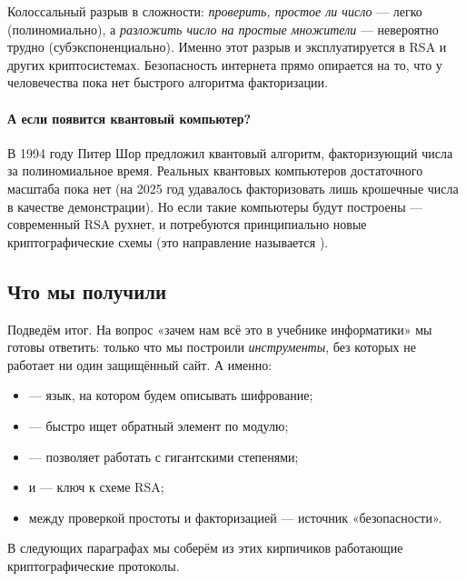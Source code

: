\begin{importantbox}
Колоссальный разрыв в сложности: \emph{проверить, простое ли число} --- легко (полиномиально), а \emph{разложить число на простые множители} --- невероятно трудно (субэкспоненциально). Именно этот разрыв и эксплуатируется в RSA и других криптосистемах. Безопасность интернета прямо опирается на то, что у человечества пока нет быстрого алгоритма факторизации.
\end{importantbox}

\paragraph*{А если появится квантовый компьютер?} В 1994 году Питер Шор предложил квантовый алгоритм, факторизующий числа за полиномиальное время. Реальных квантовых компьютеров достаточного масштаба пока нет (на 2025 год удавалось факторизовать лишь крошечные числа в качестве демонстрации). Но если такие компьютеры будут построены --- современный RSA рухнет, и потребуются принципиально новые криптографические схемы (это направление называется ).

\subsection*{Что мы получили}

Подведём итог. На вопрос «зачем нам всё это в учебнике информатики» мы готовы ответить: только что мы построили \emph{инструменты}, без которых не работает ни один защищённый сайт. А именно:
\begin{itemize}
  \item {} --- язык, на котором будем описывать шифрование;
  \item {} --- быстро ищет обратный элемент по модулю;
  \item {} --- позволяет работать с гигантскими степенями;
  \item {} и  --- ключ к схеме RSA;
  \item {} между проверкой простоты и факторизацией --- источник «безопасности».
\end{itemize}

\noindent
В следующих параграфах мы соберём из этих кирпичиков работающие криптографические протоколы.

